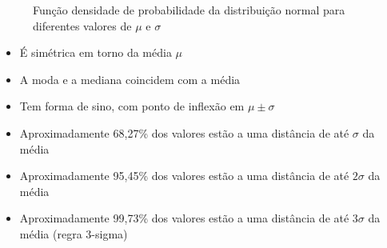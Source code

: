 \documentclass[a4paper,12pt]{article}
\begin{document}
\begin{figure}[H]
\centering
{}
\caption{Função densidade de probabilidade da distribuição normal para diferentes valores de $\mu$ e $\sigma$}
\end{figure}

\begin{tcolorbox}[colback=yellow!5, colframe=yellow!40, title=\textbf{Propriedades da Distribuição Normal}]
\begin{itemize}
    \item É simétrica em torno da média $\mu$
    \item A moda e a mediana coincidem com a média
    \item Tem forma de sino, com ponto de inflexão em $\mu \pm \sigma$
    \item Aproximadamente 68,27\% dos valores estão a uma distância de até $\sigma$ da média
    \item Aproximadamente 95,45\% dos valores estão a uma distância de até $2\sigma$ da média
    \item Aproximadamente 99,73\% dos valores estão a uma distância de até $3\sigma$ da média (regra 3-sigma)
\end{itemize}
\end{tcolorbox}
\end{document}
